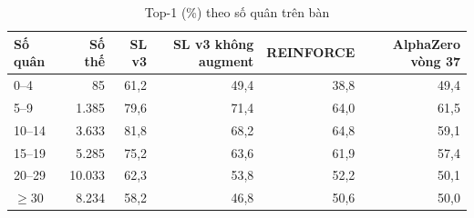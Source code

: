 \begin{table}[H]
  \centering
  \footnotesize
  \caption{Top-1 (\%) theo số quân trên bàn}
  \label{tab:cs-mang-giaidoan-top1}
  \begin{tabular}{lrrrrr}
    \toprule
    Số quân & Số thế & SL v3 & SL v3 không augment & REINFORCE & AlphaZero vòng 37 \\
    \midrule
    0--4 & 85 & 61,2 & 49,4 & 38,8 & 49,4 \\
    5--9 & 1.385 & 79,6 & 71,4 & 64,0 & 61,5 \\
    10--14 & 3.633 & 81,8 & 68,2 & 64,8 & 59,1 \\
    15--19 & 5.285 & 75,2 & 63,6 & 61,9 & 57,4 \\
    20--29 & 10.033 & 62,3 & 53,8 & 52,2 & 50,1 \\
    $\ge 30$ & 8.234 & 58,2 & 46,8 & 50,6 & 50,0 \\
    \bottomrule
  \end{tabular}
\end{table}
